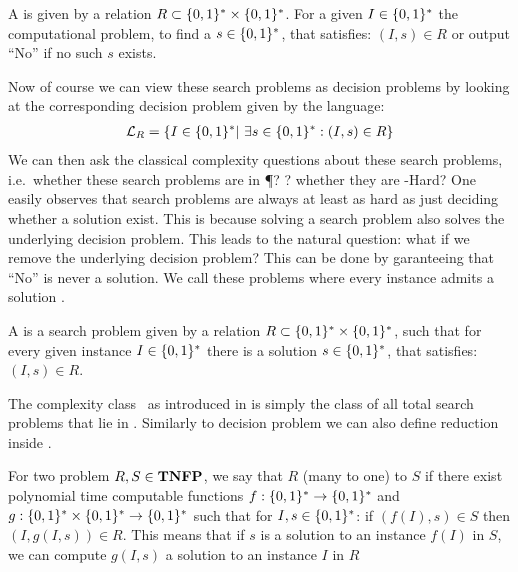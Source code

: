 \begin{definition}
    A  is given by a relation $R\subset \{0, 1\}^* \times \{0, 1\}^*$.
    For a given  $I\in \{0, 1\}^*$ the computational problem, to find a  $s \in \{0, 1\}^*$, that satisfies:
    $(I, s) \in R$ or output ``No'' if no such $s$ exists.
\end{definition}
Now of course we can view these search problems as decision problems by looking at the corresponding decision problem given by the language:
\begin{align*}
    \mathcal{L}_R = \{ I \in \{0, 1\}^* |\ \exists s \in \{0, 1\}^* : (I, s) \in R\}
\end{align*}
We can then ask the classical complexity questions about these search problems, i.e.~whether these search problems are in \P? \NP? whether they are \NP-Hard?
One easily observes that search problems are always at least as hard as just deciding whether a solution exist.
This is because solving a search problem also solves the underlying decision problem.
This leads to the natural question: what if we remove the underlying decision problem?
This can be done by garanteeing that ``No'' is never a solution.
We call these problems where every instance admits a solution .
\begin{definition}
    A  is a search problem given by a relation $R\subset \{0, 1\}^* \times \{0, 1\}^*$, such that for every given instance $I\in
        \{0, 1\}^*$ there is a solution $s \in \{0, 1\}^*$, that satisfies: $(I, s) \in R$.
\end{definition}
The complexity class \TFNP\ as introduced in  is simply the class of all total search problems that lie in \NP.
Similarly to decision problem we can also define reduction inside \TFNP.
\begin{definition}[Reduction]
    For two problem $R, S \in \textbf{TNFP}$, we say that $R$  (many to one) to $S$ if there exist polynomial time computable functions $f : \{0, 1\}^*
        \rightarrow
        \{0, 1\}^*$ and $g : \{0, 1\}^* \times \{0, 1\}^* \rightarrow \{0, 1\}^*$ such that for $I, s \in \{0, 1\}^*$: if $(f(I), s) \in S$ then $(I, g(I, s)) \in R$.
    This means that if $s$ is a solution to an instance $f(I)$ in $S$, we can compute $g(I, s)$ a solution to an instance $I$ in $R$
\end{definition}

